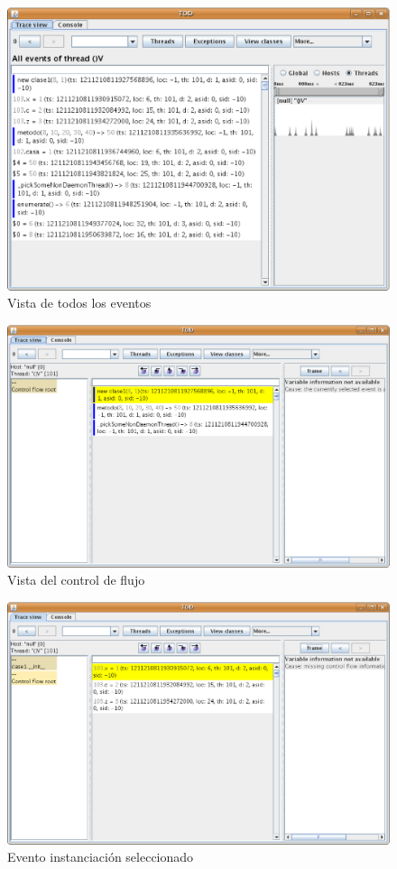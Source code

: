 \documentclass[10pt,a4paper]{article}
\begin{document}
\newpage
\begin{figure}[hpb]
	\centering
	\includegraphics[scale=0.3]{images/TOD-2.eps}
	\caption{Vista de todos los eventos}
\end{figure}

\begin{figure}[hpb]
	\centering
	\includegraphics[scale=0.3]{images/TOD-3.eps}
	\caption{Vista del control de flujo}
\end{figure}

\newpage
\begin{figure}[hpb]
	\centering
	\includegraphics[scale=0.3]{images/TOD-4.eps}
	\caption{Evento instanciación seleccionado}
\end{figure}
\end{document}
